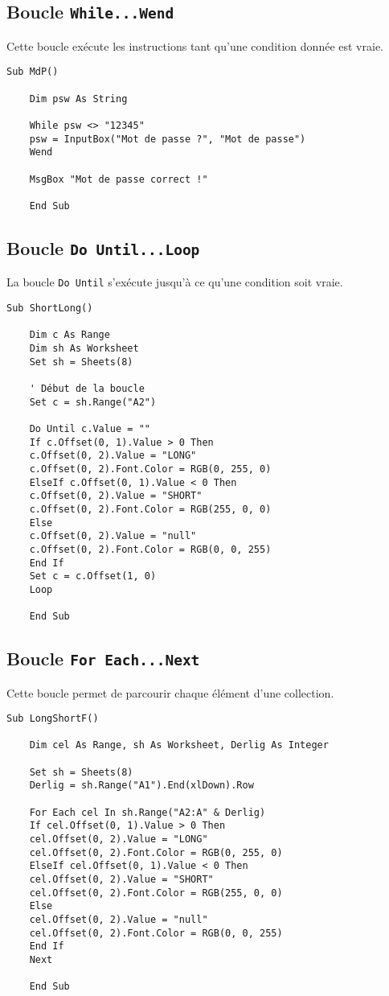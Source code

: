 \documentclass[a4paper,12pt]{report}
\begin{document}
\subsection{Boucle \texttt{While...Wend}}
Cette boucle exécute les instructions tant qu'une condition donnée est vraie.

\begin{lstlisting}[caption=Exemple de boucle While...Wend]
	Sub MdP()
	
	Dim psw As String
	
	While psw <> "12345"
	psw = InputBox("Mot de passe ?", "Mot de passe")
	Wend
	
	MsgBox "Mot de passe correct !"
	
	End Sub
\end{lstlisting}

\subsection{Boucle \texttt{Do Until...Loop}}
La boucle \texttt{Do Until} s'exécute jusqu'à ce qu'une condition soit vraie.

\begin{lstlisting}[caption=Exemple de boucle Do Until...Loop]
	Sub ShortLong()
	
	Dim c As Range
	Dim sh As Worksheet
	Set sh = Sheets(8)
	
	' Début de la boucle
	Set c = sh.Range("A2")
	
	Do Until c.Value = ""
	If c.Offset(0, 1).Value > 0 Then
	c.Offset(0, 2).Value = "LONG"
	c.Offset(0, 2).Font.Color = RGB(0, 255, 0)
	ElseIf c.Offset(0, 1).Value < 0 Then
	c.Offset(0, 2).Value = "SHORT"
	c.Offset(0, 2).Font.Color = RGB(255, 0, 0)
	Else
	c.Offset(0, 2).Value = "null"
	c.Offset(0, 2).Font.Color = RGB(0, 0, 255)
	End If
	Set c = c.Offset(1, 0)
	Loop
	
	End Sub
\end{lstlisting}
\newpage
\subsection{Boucle \texttt{For Each...Next}}
Cette boucle permet de parcourir chaque élément d'une collection.

\begin{lstlisting}[caption=Exemple de boucle For Each...Next]
	Sub LongShortF()
	
	Dim cel As Range, sh As Worksheet, Derlig As Integer
	
	Set sh = Sheets(8)
	Derlig = sh.Range("A1").End(xlDown).Row
	
	For Each cel In sh.Range("A2:A" & Derlig)
	If cel.Offset(0, 1).Value > 0 Then
	cel.Offset(0, 2).Value = "LONG"
	cel.Offset(0, 2).Font.Color = RGB(0, 255, 0)
	ElseIf cel.Offset(0, 1).Value < 0 Then
	cel.Offset(0, 2).Value = "SHORT"
	cel.Offset(0, 2).Font.Color = RGB(255, 0, 0)
	Else
	cel.Offset(0, 2).Value = "null"
	cel.Offset(0, 2).Font.Color = RGB(0, 0, 255)
	End If
	Next
	
	End Sub
\end{lstlisting}
\end{document}
